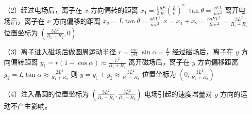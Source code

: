 \documentclass[\gkver]{gaokaozhenti}
\begin{document}
\begin{enumerate}
{（2）经过电场后，离子在 $x$ 方向偏转的距离 $x_{1} = \frac{1}{2}\frac{qE}{m}\left( \frac{L}{v} \right)^{2}$
$\tan\theta = \frac{qEL}{mv^{2}}$
离开电场后，离子在 $x$ 方向偏移的距离 $x_{2} = L\tan\theta = \frac{qEL^{2}}{mv^{2}}$
$x = x_{1} + x_{2} = \frac{3qEL^{2}}{2mv^{2}} = \frac{3L^{2}}{R_{1} + R_{2}}$
位置坐标为 $\left( \frac{3L^{2}}{R_{1} + R_{2}}, 0 \right)$

（3）离子进入磁场后做圆周运动半径 $r = \frac{mv}{qB}$
$\sin\alpha = \frac{L}{r}$
经过磁场后，离子在 $y$ 方向偏转距离 $y_{1} = r(1 - \cos\alpha) \approx \frac{L^{2}}{R_{1} + R_{2}}$
离开磁场后，离子在 $y$ 方向偏移距离 $y_{2} = L\tan\alpha \approx \frac{2L^{2}}{R_{1} + R_{2}}$
则 $y = y_{1} + y_{2} \approx \frac{3L^{2}}{R_{1} + R_{2}}$
位置坐标为 $\left( 0, \frac{3L^{2}}{R_{1} + R_{2}} \right)$


（4）注入晶圆的位置坐标为 $\left( \frac{3L^{2}}{R_{1} + R_{2}}, \frac{3L^{2}}{R_{1} + R_{2}} \right)$
电场引起的速度增量对 $y$ 方向的运动不产生影响。
}

\end{enumerate}
\end{document}
